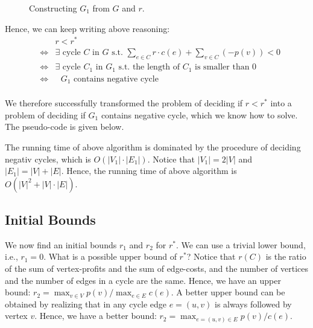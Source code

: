\begin{figure}[h]
\centering{}
\vspace{-2.6cm}
\caption{Constructing $G_1$ from $G$ and $r$.}
\label{fig:cycle}
\end{figure}


Hence, we can keep writing above reasoning:
\begin{eqnarray*}
& & r < r^* \\
& \Longleftrightarrow & \exists \textrm{ cycle } C \textrm{ in $G$ s.t.\ } \textstyle \sum_{e\in C} r\cdot c(e) + \sum_{v\in C} (-p(v)) < 0 \\
& \Longleftrightarrow & \exists \textrm{ cycle } C_1 \textrm{ in $G_1$ s.t.\ the length of $C_1$ is smaller than 0 } \\
& \Longleftrightarrow & \textrm{ $G_1$ contains negative cycle } \\
\end{eqnarray*}

We therefore successfully transformed the problem of deciding if $r < r^*$ into a problem of deciding if $G_1$ contains negative cycle,
which we know how to solve.
The pseudo-code is given below.

\begin{minipage}{0.8\textwidth}
	\xxx
	\xxx
	\xxx
	\xxx
	\xxx
	\xxx
\end{minipage}

The running time of above algorithm is dominated by the procedure of deciding negativ cycles, which is $O(|V_1|\cdot |E_1|)$.
Notice that $|V_1| = 2|V|$ and $|E_1| = |V| + |E|$. Hence, the running time of above algorithm is $O(|V|^2 + |V| \cdot |E|)$.


\subsection*{Initial Bounds}

We now find an initial bounds $r_1$ and $r_2$ for $r^*$.
We can use a trivial lower bound, i.e., $r_1 = 0$.
What is a possible upper bound of $r^*$?
Notice that $r(C)$ is the ratio of the sum of vertex-profits and the sum of edge-costs,
and the number of vertices and the number of edges in a cycle are the same.
Hence, we have an upper bound: $r_2 = \max_{v\in V} p(v) / \max_{e\in E} c(e)$.
A better upper bound can be obtained by realizing that in any cycle edge $e = (u,v)$ is always followed by vertex $v$.
Hence, we have a better bound: $r_2 = \max_{e = (u,v) \in E} p(v) / c(e)$.

